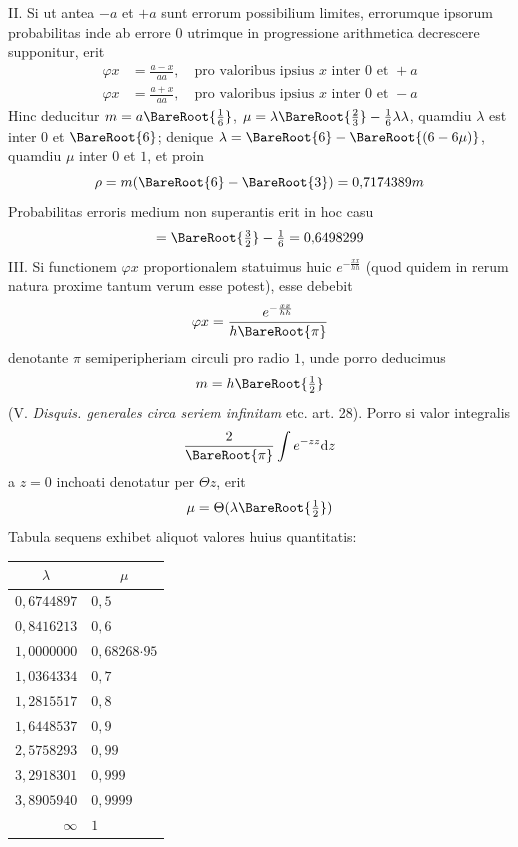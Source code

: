 II. Si ut antea \(-a\) et \(+a\) sunt errorum possibilium limites, errorumque ipsorum probabilitas inde ab errore \(0\) utrimque in progressione arithmetica decrescere supponitur, erit
\[
\begin{aligned}
\varphi x&=\frac{a-x}{aa},\quad\text{pro valoribus ipsius }x\text{ inter }0\text{ et }+a\\[3pt]
\varphi x&=\frac{a+x}{aa},\quad\text{pro valoribus ipsius }x\text{ inter }0\text{ et }-a
\end{aligned}
\]
Hinc deducitur \(m=a\BareRoot{\tfrac16}\), \(\mu=\lambda\BareRoot{\tfrac23}-\tfrac16\lambda\lambda\), quamdiu \(\lambda\) est inter \(0\) et \(\BareRoot{6}\); denique \(\lambda=\BareRoot{6}-\BareRoot{(6-6\mu)}\), quamdiu \(\mu\) inter \(0\) et \(1\), et proin
\[
\rho=m(\BareRoot{6}-\BareRoot{3})=0{,}7174389m
\]
Probabilitas erroris medium non superantis erit in hoc casu
\[
=\BareRoot{\tfrac32}-\tfrac16=0{,}6498299
\]
III. Si functionem \(\varphi x\) proportionalem statuimus huic \(e^{-\frac{xx}{hh}}\) (quod quidem in rerum natura proxime tantum verum esse potest), esse debebit
\[
\varphi x=\frac{e^{-\frac{xx}{hh}}}{h\BareRoot{\pi}}
\]
denotante \(\pi\) semiperipheriam circuli pro radio \(1\), unde porro deducimus
\[
m=h\BareRoot{\tfrac12}
\]
(V. \textit{Disquis. generales circa seriem infinitam} etc. art. 28). Porro si valor integralis
\[
\frac{2}{\BareRoot{\pi}}\int e^{-zz}\mathrm{d}z
\]
a \(z=0\) inchoati denotatur per \(\Theta z\), erit
\[
\mu=\Theta(\lambda\BareRoot{\tfrac12})
\]
Tabula sequens exhibet aliquot valores huius quantitatis:
\begin{center}
\begin{tabular}{r|l}
\multicolumn{1}{c|}{\(\lambda\)}&\multicolumn{1}{c}{\(\mu\)}\\\hline
\(0{,}6744897\)&\(0{,}5\)\\
\(0{,}8416213\)&\(0{,}6\)\\
\(1{,}0000000\)&\(0{,}68268\mathord{\cdot}95\)\\
\(1{,}0364334\)&\(0{,}7\)\\
\(1{,}2815517\)&\(0{,}8\)\\
\(1{,}6448537\)&\(0{,}9\)\\
\(2{,}5758293\)&\(0{,}99\)\\
\(3{,}2918301\)&\(0{,}999\)\\
\(3{,}8905940\)&\(0{,}9999\)\\
\(\infty\)&\(1\)
\end{tabular}
\end{center}

